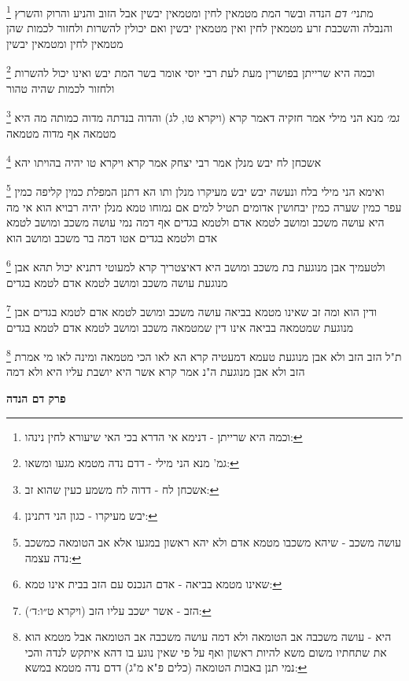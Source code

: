 \documentclass[12pt, openany]{book}
\newcommand{\sethebfont}{
\fontsize{10.5pt}{21.0pt} \selectfont
}
\newcommand{\twocol}[1]{
	{\sethebfont \begin{multicols}{2}
			#1
	\end{multicols}}	
}
\newcommand{\chapname}{}
\newcommand{\newchap}[1]{
	\addcontentsline{toc}{chapter}{#1}
	\renewcommand{\chapname}{#1}
		\begin{center}
			\textbf{%
\fontsize{16pt}{16pt}\selectfont
				#1}
		\end{center}
}
\newcommand{\footnotecomment}[1]{
	\renewcommand\thefootnote{}
	\footnote{#1}}
\newcommand{\commenta}[1]{\footnotecomment{#1}}
\begin{document}
{{\commenta{וכמה היא שרייתן - דנימא אי הדרא בכי האי שיעורא לחין נינהו:}
מתני׳ {\large\emph{דם}} הנדה ובשר המת מטמאין לחין ומטמאין יבשין אבל הזוב והניע והרוק והשרץ והנבלה והשכבת זרע מטמאין לחין ואין מטמאין יבשין ואם יכולין להשרות ולחזור לכמות שהן מטמאין לחין ומטמאין יבשין 
\commenta{גמ' מנא הני מילי - דדם נדה מטמא מגעו ומשאו:}
וכמה היא שרייתן בפושרין מעת לעת רבי יוסי אומר בשר המת יבש ואינו יכול להשרות ולחזור לכמות שהיה טהור
\commenta{אשכחן לח - דדוה לח משמע כעין שהוא זב:}
{\large\emph{גמ׳}} מנא הני מילי אמר חזקיה דאמר קרא (ויקרא טו, לג) והדוה בנדתה מדוה כמותה מה היא מטמאה אף מדוה מטמאה 
\commenta{יבש מעיקרו - כגון הני דתנינן:}
אשכחן לח יבש מנלן אמר רבי יצחק אמר קרא {ויקרא טו } יהיה בהויתו יהא 
\commenta{עושה משכב - שיהא משכבו מטמא אדם ולא יהא ראשון במגעו אלא אב הטומאה כמשכב נדה עצמה:}
ואימא הני מילי בלח ונעשה יבש יבש מעיקרו מנלן ותו הא דתנן המפלת כמין קליפה כמין עפר כמין שערה כמין יבחושין אדומים תטיל למים אם נמוחו טמא מנלן יהיה רבויא הוא 
אי מה היא עושה משכב ומושב לטמא אדם ולטמא בגדים אף דמה נמי עושה משכב ומושב לטמא אדם ולטמא בגדים אטו דמה בר משכב ומושב הוא 
\commenta{שאינו מטמא בביאה - אדם הנכנס עם הזב בבית אינו טמא:}
ולטעמיך אבן מנוגעת בת משכב ומושב היא דאיצטריך קרא למעוטי דתניא יכול תהא אבן מנוגעת עושה משכב ומושב לטמא אדם לטמא בגדים 
\commenta{הזב - אשר ישכב עליו הזב (ויקרא ט״ו:ד׳):}
ודין הוא ומה זב שאינו מטמא בביאה עושה משכב ומושב לטמא אדם לטמא בגדים אבן מנוגעת שמטמאה בביאה אינו דין שמטמאה משכב ומושב לטמא אדם לטמא בגדים
\commenta{היא - עושה משכבה אב הטומאה ולא דמה עושה משכבה אב הטומאה אבל מטמא הוא את שתחתיו משום משא להיות ראשון ואף על פי שאין נוגע בו דהא איתקש לנדה והכי נמי תנן באבות הטומאה (כלים פ"א מ"ג) דדם נדה מטמא במשא:}
ת"ל הזב הזב ולא אבן מנוגעת טעמא דמעטיה קרא הא לאו הכי מטמאה 
ומינה לאו מי אמרת הזב ולא אבן מנוגעת ה"נ אמר קרא אשר היא יושבת עליו היא ולא דמה}

\newchap{פרק  דם הנדה}
\twocol{\clearpage}

}
\end{document}
